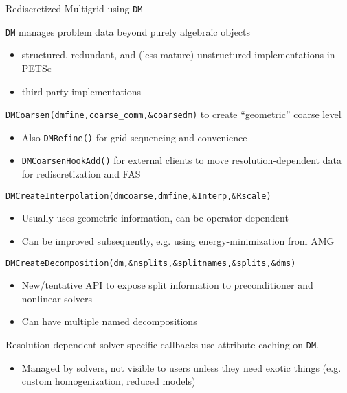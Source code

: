 \begin{frame}{Rediscretized Multigrid using \texttt{DM}}
  \begin{itemize}
{\scriptsize
  \item \texttt{DM} manages problem data beyond purely algebraic objects
    \begin{itemize}
    \item structured, redundant, and (less mature) unstructured implementations in PETSc
    \item third-party implementations
    \end{itemize}
  \item \texttt{DMCoarsen(dmfine,coarse\_comm,\&coarsedm)} to create ``geometric'' coarse level
    \begin{itemize}
    \item Also \texttt{DMRefine()} for grid sequencing and convenience
    \item \texttt{DMCoarsenHookAdd()} for external clients to move resolution-dependent data for rediscretization and FAS
    \end{itemize}
  \item \texttt{DMCreateInterpolation(dmcoarse,dmfine,\&Interp,\&Rscale)}
    \begin{itemize}
    \item Usually uses geometric information, can be operator-dependent
    \item Can be improved subsequently, e.g. using energy-minimization from AMG
    \end{itemize}
  \item \texttt{DMCreateDecomposition(dm,\&nsplits,\&splitnames,\&splits,\&dms)}
    \begin{itemize}
    \item New/tentative API to expose split information to preconditioner and nonlinear solvers
    \item Can have multiple named decompositions
    \end{itemize}
  \item Resolution-dependent solver-specific callbacks use attribute caching on \texttt{DM}.
    \begin{itemize}
    \item Managed by solvers, not visible to users unless they need exotic things (e.g. custom homogenization, reduced models)
    \end{itemize}
}
  \end{itemize}
\end{frame}
